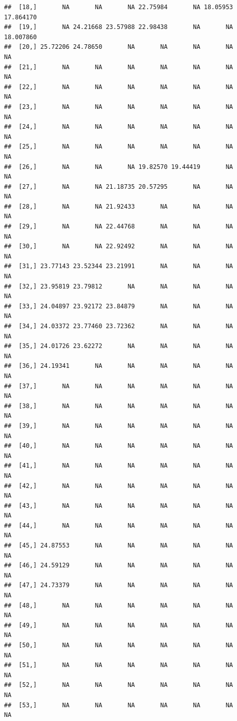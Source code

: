 \documentclass{article}\usepackage[]{graphicx}\usepackage[]{color}
\makeatletter
\newenvironment{kframe}{%
 \def\at@end@of@kframe{}%
 \ifinner\ifhmode%
  \def\at@end@of@kframe{\end{minipage}}%
  \begin{minipage}{\columnwidth}%
 \fi\fi%
 \def\FrameCommand##1{\hskip\@totalleftmargin \hskip-\fboxsep
 \colorbox{shadecolor}{##1}\hskip-\fboxsep
     \hskip-\linewidth \hskip-\@totalleftmargin \hskip\columnwidth}%
 \MakeFramed {\advance\hsize-\width
   \@totalleftmargin\z@ \linewidth\hsize
   \@setminipage}}%
 {\par\unskip\endMakeFramed%
 \at@end@of@kframe}
\newenvironment{knitrout}{}{} %
\makeatother
\begin{document}
\begin{knitrout}
\begin{kframe}
\begin{verbatim}
##  [18,]       NA       NA       NA 22.75984       NA 18.05953 17.864170
##  [19,]       NA 24.21668 23.57988 22.98438       NA       NA 18.007860
##  [20,] 25.72206 24.78650       NA       NA       NA       NA        NA
##  [21,]       NA       NA       NA       NA       NA       NA        NA
##  [22,]       NA       NA       NA       NA       NA       NA        NA
##  [23,]       NA       NA       NA       NA       NA       NA        NA
##  [24,]       NA       NA       NA       NA       NA       NA        NA
##  [25,]       NA       NA       NA       NA       NA       NA        NA
##  [26,]       NA       NA       NA 19.82570 19.44419       NA        NA
##  [27,]       NA       NA 21.18735 20.57295       NA       NA        NA
##  [28,]       NA       NA 21.92433       NA       NA       NA        NA
##  [29,]       NA       NA 22.44768       NA       NA       NA        NA
##  [30,]       NA       NA 22.92492       NA       NA       NA        NA
##  [31,] 23.77143 23.52344 23.21991       NA       NA       NA        NA
##  [32,] 23.95819 23.79812       NA       NA       NA       NA        NA
##  [33,] 24.04897 23.92172 23.84879       NA       NA       NA        NA
##  [34,] 24.03372 23.77460 23.72362       NA       NA       NA        NA
##  [35,] 24.01726 23.62272       NA       NA       NA       NA        NA
##  [36,] 24.19341       NA       NA       NA       NA       NA        NA
##  [37,]       NA       NA       NA       NA       NA       NA        NA
##  [38,]       NA       NA       NA       NA       NA       NA        NA
##  [39,]       NA       NA       NA       NA       NA       NA        NA
##  [40,]       NA       NA       NA       NA       NA       NA        NA
##  [41,]       NA       NA       NA       NA       NA       NA        NA
##  [42,]       NA       NA       NA       NA       NA       NA        NA
##  [43,]       NA       NA       NA       NA       NA       NA        NA
##  [44,]       NA       NA       NA       NA       NA       NA        NA
##  [45,] 24.87553       NA       NA       NA       NA       NA        NA
##  [46,] 24.59129       NA       NA       NA       NA       NA        NA
##  [47,] 24.73379       NA       NA       NA       NA       NA        NA
##  [48,]       NA       NA       NA       NA       NA       NA        NA
##  [49,]       NA       NA       NA       NA       NA       NA        NA
##  [50,]       NA       NA       NA       NA       NA       NA        NA
##  [51,]       NA       NA       NA       NA       NA       NA        NA
##  [52,]       NA       NA       NA       NA       NA       NA        NA
##  [53,]       NA       NA       NA       NA       NA       NA        NA

\end{verbatim}
\end{kframe}
\end{knitrout}
\end{document}
